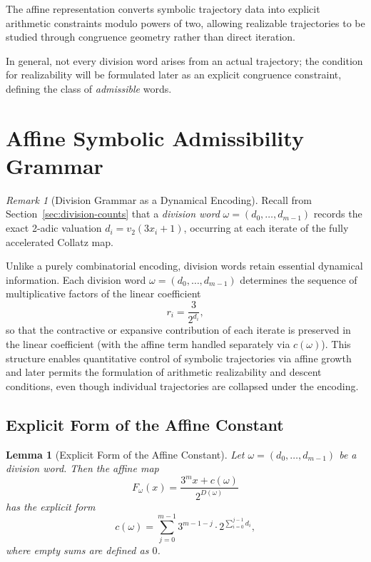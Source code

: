 \documentclass[12pt, oneside]{article}
\numberwithin{equation}{section}
\theoremstyle{definition}
\theoremstyle{plain}
\newtheorem{lemma}[theorem]{Lemma}
\theoremstyle{remark}
\newtheorem*{remark}{Remark}
\begin{document}
The affine representation converts symbolic trajectory data into explicit
arithmetic constraints modulo powers of two, allowing realizable trajectories
to be studied through congruence geometry rather than direct iteration.

\medskip

\noindent
In general, not every division word arises from an actual trajectory;
the condition for realizability will be formulated later as an explicit
congruence constraint, defining the class of \emph{admissible} words.

\section{Affine Symbolic Admissibility Grammar}
\label{sec:affine-grammar}

\begin{remark}[Division Grammar as a Dynamical Encoding]
Recall from Section~\ref{sec:division-counts} that a \emph{division word}
$\omega=(d_0,\dots,d_{m-1})$ records the exact 2-adic valuation
$d_i = v_2(3 x_i + 1)$, occurring at each iterate of the fully accelerated
Collatz map.

Unlike a purely combinatorial encoding, division words retain essential
dynamical information. Each division word $\omega=(d_0,\dots,d_{m-1})$
determines the sequence of multiplicative factors of the linear coefficient
\[
r_i = \frac{3}{2^{d_i}},
\]
so that the contractive or expansive contribution of each iterate is
preserved in the linear coefficient (with the affine term handled separately
via $c(\omega)$). This structure enables quantitative control of symbolic
trajectories via affine growth and later permits the formulation of
arithmetic realizability and descent conditions, even though individual
trajectories are collapsed under the encoding.
\end{remark}

\subsection{Explicit Form of the Affine Constant}
\begin{lemma}[Explicit Form of the Affine Constant]
Let $\omega = (d_0,\dots,d_{m-1})$ be a division word. Then the affine map
\[
F_\omega(x) = \frac{3^m x + c(\omega)}{2^{D(\omega)}}
\]
has the explicit form
\[
c(\omega)
=
\sum_{j=0}^{m-1}
3^{m-1-j}\cdot 2^{\sum_{i=0}^{j-1} d_i},
\]
where empty sums are defined as $0$.
\end{lemma}
\end{document}

